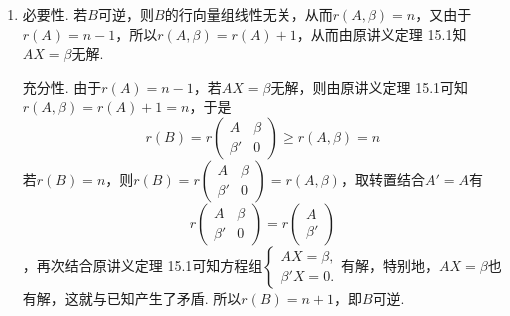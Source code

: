 \documentclass[UTF8,12pt,a4paper,fontset=fandol]{ctexart}
\begin{document}
\begin{solve}
\begin{enumerate}
                \item 必要性. 若$B$可逆，则$B$的行向量组线性无关，从而$r(A,\beta)=n$，又由于$r(A)=n-1$，所以$r(A,\beta)=r(A)+1$，从而由原讲义定理 15.1知$AX=\beta$无解.

                      充分性. 由于$r(A)=n-1$，若$AX=\beta$无解，则由原讲义定理 15.1可知$r(A,\beta)=r(A)+1=n$，于是
                      \[ r(B)=r\begin{pmatrix}
                              A      & \beta \\
                              \beta' & 0
                          \end{pmatrix}\geqslant r(A,\beta)=n \]
                      若$r(B)=n$，则$r(B)=r\begin{pmatrix}
                              A      & \beta \\
                              \beta' & 0
                          \end{pmatrix}=r(A,\beta)$，取转置结合$A'=A$有
\[r\begin{pmatrix}
                              A      & \beta \\
                              \beta' & 0
                          \end{pmatrix}=r\begin{pmatrix}
                              A \\
                              \beta'
                          \end{pmatrix}\]
，再次结合原讲义定理 15.1可知方程组$\begin{cases}
                              AX=\beta, \\
                              \beta' X=0.
                          \end{cases}$有解，特别地，$AX=\beta$也有解，这就与已知产生了矛盾. 所以$r(B)=n+1$，即$B$可逆.
            \end{enumerate}
\end{solve}
\end{document}

